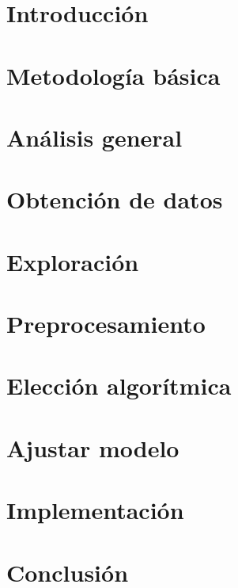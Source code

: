 \section{Introducción}


\section{Metodología básica}


\section{Análisis general}


\section{Obtención de datos}


\section{Exploración}


\section{Preprocesamiento}


\section{Elección algorítmica}


\section{Ajustar modelo}


\section{Implementación}


\section{Conclusión}

